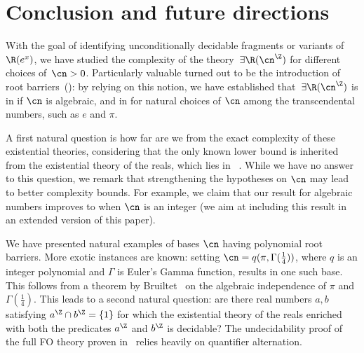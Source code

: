 \section{Conclusion and future directions}
\label{sec:conclusion}

With the goal of identifying unconditionally decidable fragments or variants of
$\R(e^x)$, we have studied the complexity of the theory~$\exists \R(\ipow{\cn})$
for different choices of~${\cn > 0}$. Particularly valuable turned out to be the
introduction of root barriers~(): by relying
on this notion, we have established that~$\exists \R(\ipow{\cn})$ is in
\expspace if $\cn$ is algebraic, and in \threeexptime for natural choices of
$\cn$ among the transcendental numbers, such as $e$ and $\pi$.

A first natural question is how far are we from the exact complexity of these
existential theories, considering that the only known lower bound  is
inherited from the existential theory of the reals, which lies in
\pspace~\cite{Canny88}. While we have no answer to this question, we remark that
strengthening the hypotheses on $\cn$ may lead to better complexity bounds.
For example, we claim that our \expspace result for algebraic
numbers improves to \exptime when $\cn$ is an integer (we aim at
including this result in an extended version of this paper).


We have presented natural examples of bases $\cn$ having polynomial root
barriers. 
More exotic instances are known: setting $\cn
= q(\pi,\Gamma(\frac{1}{4}))$, where $q$ is an integer polynomial and $\Gamma$
is Euler's Gamma function, results in one such base. This follows from a theorem
by Bruiltet~\cite[Theorem B$^\prime$]{Bruiltet02} on the algebraic independence
of $\pi$ and $\Gamma(\frac{1}{4})$.
This leads to a second natural question: are there real numbers $a,b$ satisfying
$\ipow{a} \cap \ipow{b} = \{1\}$ for which the existential theory of the reals
enriched with both the predicates $\ipow{a}$ and $\ipow{b}$ is decidable? The
undecidability proof of the full FO theory proven in~\cite{Hieronymi10} relies
heavily on quantifier alternation. 
